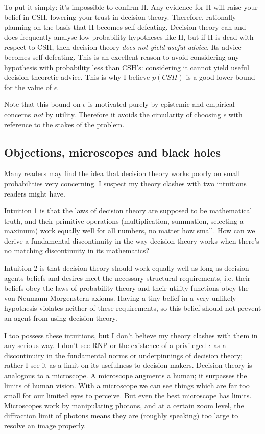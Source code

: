 \documentclass{article}
\begin{document}
To put it simply: it's impossible to confirm H. Any evidence for H will raise your belief in CSH, lowering your trust in decision theory. Therefore, rationally planning on the basis that H becomes self-defeating. Decision theory can and does frequently analyse low-probability hypotheses like H, but if H is dead with respect to CSH, then decision theory \textit{does not yield useful advice}. Its advice becomes self-defeating. This is an excellent reason to avoid considering any hypothesis with probability less than CSH's: considering it cannot yield useful decision-theoretic advice. This is why I believe \(p(CSH)\) is a good lower bound for the value of \(\epsilon\).

Note that this bound on \(\epsilon\) is motivated purely by epistemic and empirical concerns \textemdash{} \textit{not} by utility. Therefore it avoids the circularity of choosing \(\epsilon\) with reference to the stakes of the problem.

\subsection{Objections, microscopes and black holes}

Many readers may find the idea that decision theory works poorly on small probabilities very concerning. I suspect my theory clashes with two intuitions readers might have. 

Intuition 1 is that the laws of decision theory are supposed to be mathematical truth, and their primitive operations (multiplication, summation, selecting a maximum) work equally well for all numbers, no matter how small. How can we derive a fundamental discontinuity in the way decision theory works when there's no matching discontinuity in its mathematics? %

Intuition 2 is that decision theory should work equally well as long as decision agents beliefs and desires meet the necessary structural requirements, i.e. their beliefs obey the laws of probability theory and their utility functions obey the von Neumann-Morgenstern axioms. Having a tiny belief in a very unlikely hypothesis violates neither of these requirements, so this belief should not prevent an agent from using decision theory. %

I too possess these intuitions, but I don't believe my theory clashes with them in any serious way. I don't see RNP or the existence of a privileged \(\epsilon\) as a discontinuity in the fundamental norms or underpinnings of decision theory; rather I see it as a limit on its usefulness to decision makers. Decision theory is analogous to a microscope. A microscope augments a human; it surpasses the limits of human vision. With a microscope we can see things which are far too small for our limited eyes to perceive. But even the best microscope has limits. Microscopes work by manipulating photons, and at a certain zoom level, the diffraction limit of photons means they are (roughly speaking) too large to resolve an image properly. 
\end{document}
